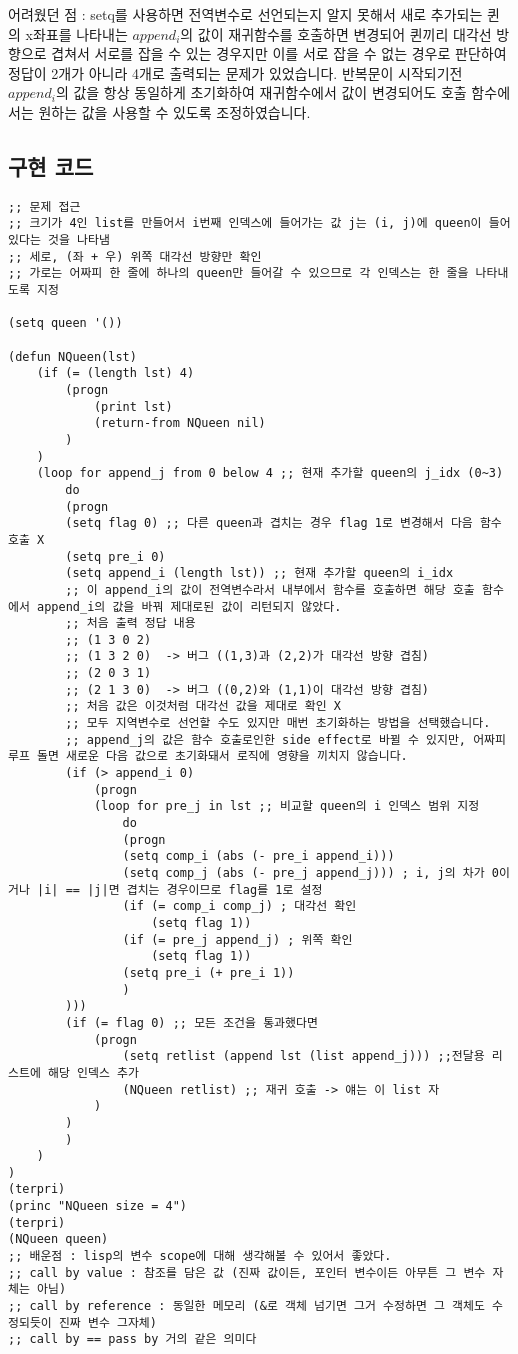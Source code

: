 \documentclass[11pt,oneside,a4paper]{article}
\begin{document}
어려웠던 점 : setq를 사용하면 전역변수로 선언되는지 알지 못해서 새로 추가되는 퀸의 x좌표를 나타내는 $append_i$의 값이 재귀함수를 호출하면 변경되어 퀸끼리 대각선 방향으로 겹쳐서 서로를 잡을 수 있는 경우지만
이를 서로 잡을 수 없는 경우로 판단하여 정답이 2개가 아니라 4개로 출력되는 문제가 있었습니다.
반복문이 시작되기전 $append_i$의 값을 항상 동일하게 초기화하여 재귀함수에서 값이 변경되어도 호출 함수에서는 원하는 값을 사용할 수 있도록 조정하였습니다.

\subsection{구현 코드}
\begin{verbatim} 
;; 문제 접근
;; 크기가 4인 list를 만들어서 i번째 인덱스에 들어가는 값 j는 (i, j)에 queen이 들어있다는 것을 나타냄
;; 세로, (좌 + 우) 위쪽 대각선 방향만 확인
;; 가로는 어짜피 한 줄에 하나의 queen만 들어갈 수 있으므로 각 인덱스는 한 줄을 나타내도록 지정

(setq queen '())

(defun NQueen(lst)
	(if (= (length lst) 4) 
		(progn
			(print lst)
			(return-from NQueen nil)
		)
	)
	(loop for append_j from 0 below 4 ;; 현재 추가할 queen의 j_idx (0~3)
		do
		(progn
		(setq flag 0) ;; 다른 queen과 겹치는 경우 flag 1로 변경해서 다음 함수 호출 X
		(setq pre_i 0)
		(setq append_i (length lst)) ;; 현재 추가할 queen의 i_idx
		;; 이 append_i의 값이 전역변수라서 내부에서 함수를 호출하면 해당 호출 함수에서 append_i의 값을 바꿔 제대로된 값이 리턴되지 않았다.
		;; 처음 출력 정답 내용
		;; (1 3 0 2) 
		;; (1 3 2 0)  -> 버그 ((1,3)과 (2,2)가 대각선 방향 겹침)
		;; (2 0 3 1) 
		;; (2 1 3 0)  -> 버그 ((0,2)와 (1,1)이 대각선 방향 겹침)
		;; 처음 값은 이것처럼 대각선 값을 제대로 확인 X
		;; 모두 지역변수로 선언할 수도 있지만 매번 초기화하는 방법을 선택했습니다.
		;; append_j의 값은 함수 호출로인한 side effect로 바뀔 수 있지만, 어짜피 루프 돌면 새로운 다음 값으로 초기화돼서 로직에 영향을 끼치지 않습니다.
		(if (> append_i 0)
			(progn
			(loop for pre_j in lst ;; 비교할 queen의 i 인덱스 범위 지정
				do
				(progn
				(setq comp_i (abs (- pre_i append_i)))
				(setq comp_j (abs (- pre_j append_j))) ; i, j의 차가 0이거나 |i| == |j|면 겹치는 경우이므로 flag를 1로 설정
				(if (= comp_i comp_j) ; 대각선 확인
					(setq flag 1))
				(if (= pre_j append_j) ; 위쪽 확인
					(setq flag 1))
				(setq pre_i (+ pre_i 1))
				)
		)))
		(if (= flag 0) ;; 모든 조건을 통과했다면
			(progn
				(setq retlist (append lst (list append_j))) ;;전달용 리스트에 해당 인덱스 추가
				(NQueen retlist) ;; 재귀 호출 -> 얘는 이 list 자
			)
		)
		)
	)
)
(terpri)
(princ "NQueen size = 4")
(terpri)
(NQueen queen)
;; 배운점 : lisp의 변수 scope에 대해 생각해볼 수 있어서 좋았다.
;; call by value : 참조를 담은 값 (진짜 값이든, 포인터 변수이든 아무튼 그 변수 자체는 아님)
;; call by reference : 동일한 메모리 (&로 객체 넘기면 그거 수정하면 그 객체도 수정되듯이 진짜 변수 그자체)
;; call by == pass by 거의 같은 의미다
\end{verbatim}
\end{document}
